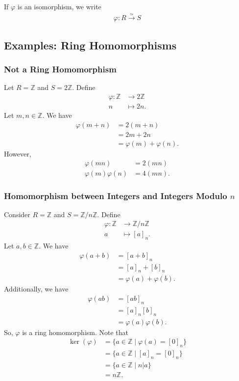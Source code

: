 \documentclass[8pt]{extarticle}
\newcommand{\Z}{\mathbb{Z}}
\begin{document}
  If $\varphi$ is an isomorphism, we write
  \begin{align*}
    \varphi: R\xrightarrow{\simeq}S
  \end{align*}
  \subsection{Examples: Ring Homomorphisms}%
  \subsubsection{Not a Ring Homomorphism}%
  Let $R = \Z$ and $S = 2\Z$. Define
  \begin{align*}
    \varphi: \Z&\rightarrow 2\Z\\
    n&\mapsto 2n.
  \end{align*}
  Let $m,n\in\Z$. We have
  \begin{align*}
    \varphi(m+n) &= 2(m+n)\\
                 &= 2m + 2n\\
                 &= \varphi(m) + \varphi(n).
  \end{align*}
  However,
  \begin{align*}
    \varphi(mn) &= 2(mn)\\
    \varphi(m)\varphi(n) &= 4(mn).
  \end{align*}
  \subsubsection{Homomorphism between Integers and Integers Modulo $n$}%
  Consider $R = \Z$ and $S = \Z/n\Z$. Define
  \begin{align*}
    \varphi:\Z&\rightarrow \Z/n\Z\\
    a&\mapsto [a]_{n}.
  \end{align*}
  Let $a,b\in\Z$. We have
  \begin{align*}
    \varphi(a+b) &= [a+b]_{n}\\
                 &= [a]_{n} + [b]_n\\
                 &= \varphi(a) + \varphi(b).
  \end{align*}
  Additionally, we have
  \begin{align*}
    \varphi(ab) &= [ab]_n\\
                &= [a]_n[b]_n\\
                &= \varphi(a)\varphi(b).
  \end{align*}
  So, $\varphi$ is a ring homomorphism. Note that
  \begin{align*}
    \ker(\varphi) &= \{a\in \Z\mid \varphi(a) = [0]_n\}\\
                  &= \{a\in \Z\mid [a]_n = [0]_n\}\\
                  &= \{a\in \Z\mid n | a\}\\
                  &= n\Z.
  \end{align*}
\end{document}

